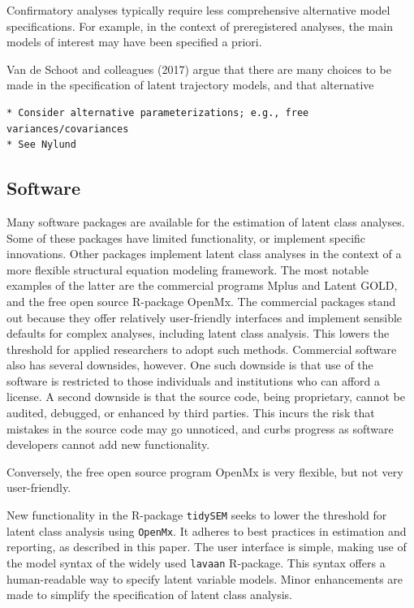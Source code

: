 \documentclass[
  ,man]{apa6}
\begin{document}
Confirmatory analyses typically require less comprehensive alternative model specifications.
For example, in the context of preregistered analyses, the main models of interest may have been specified a priori.

Van de Schoot and colleagues (2017) argue that there are many choices to be made in the specification of latent trajectory models,
and that alternative

\begin{verbatim}
* Consider alternative parameterizations; e.g., free variances/covariances 
* See Nylund
\end{verbatim}

\hypertarget{software}{%
\subsection{Software}\label{software}}

Many software packages are available for the estimation of latent class analyses.
Some of these packages have limited functionality, or implement specific innovations.
Other packages implement latent class analyses in the context of a more flexible structural equation modeling framework.
The most notable examples of the latter are the commercial programs Mplus and Latent GOLD,
and the free open source R-package OpenMx.
The commercial packages stand out because they offer relatively user-friendly interfaces
and implement sensible defaults for complex analyses, including latent class analysis.
This lowers the threshold for applied researchers to adopt such methods.
Commercial software also has several downsides, however.
One such downside is that use of the software is restricted to those individuals and institutions who can afford a license.
A second downside is that the source code, being proprietary, cannot be audited, debugged, or enhanced by third parties.
This incurs the risk that mistakes in the source code may go unnoticed, and curbs progress as software developers cannot add new functionality.

Conversely, the free open source program OpenMx is very flexible,
but not very user-friendly.

New functionality in the R-package \texttt{tidySEM} seeks to lower the threshold for latent class analysis using \texttt{OpenMx}.
It adheres to best practices in estimation and reporting, as described in this paper.
The user interface is simple, making use of the model syntax of the widely used \texttt{lavaan} R-package.
This syntax offers a human-readable way to specify latent variable models.
Minor enhancements are made to simplify the specification of latent class analysis.
\end{document}
